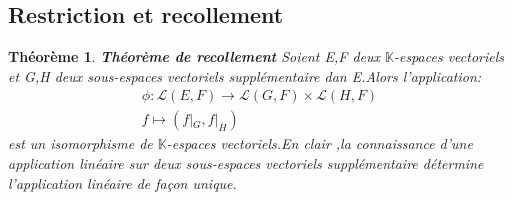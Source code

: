 \documentclass[12pt]{book}
\theoremstyle{definition}\newtheorem{dfn}{Définition}[chapter]
\theoremstyle{plain}\newtheorem{thm}{Théorème}[chapter]
\theoremstyle{plain}\newtheorem{prp}{Proposition}[chapter]
\theoremstyle{plain}\newtheorem{lem}{\bf Lemme}[chapter]
\theoremstyle{plain}\newtheorem{axm}{\bf Axiome}[chapter]
\theoremstyle{plain}\newtheorem{lmm}{\bf Lemme}[chapter]
\theoremstyle{plain}\newtheorem{exm}{\bf Example}[chapter]
\theoremstyle{plain}\newtheorem{cor}{\bf Corollaire}[chapter]
\theoremstyle{remark}\newtheorem{rem}{Remarque}[chapter]
\begin{document}
\subsection{Restriction et recollement}
\begin{thm}{\bf Théorème de recollement}  Soient E,F deux $\mathbb{K}$-espaces vectoriels et G,H deux sous-espaces vectoriels supplémentaire dan E.Alors l'application:
\begin{align*}
\phi:\mathcal{L}(E,F)\rightarrow \mathcal{L}(G,F)\times \mathcal{L}(H,F)\\
f\mapsto (f|_{G},f|_{H})
\end{align*}
est un isomorphisme de $\mathbb{K}$-espaces vectoriels.En clair ,la connaissance d'une application linéaire sur deux sous-espaces  vectoriels supplémentaire détermine l'application linéaire de façon unique.
\end{thm}
\end{document}
